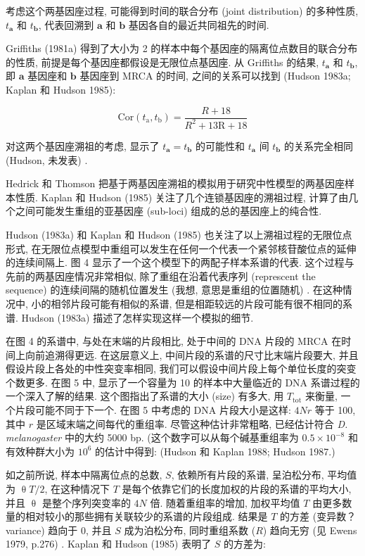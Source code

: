 \documentclass[12pt]{article}
\begin{document}
考虑这个两基因座过程, 可能得到时间的联合分布 (joint distribution) 的多种性质, $t_{\mathbf{a}}$ 和
$t_{\mathbf{b}}$, 代表回溯到 $\mathbf{a}$ 和 $\mathbf{b}$ 基因各自的最近共同祖先的时间.

Griffiths (1981a) 得到了大小为 2 的样本中每个基因座的隔离位点数目的联合分布的性质,
前提是每个基因座都假设是无限位点基因座. 从 Griffiths 的结果, $t_{\mathbf{a}}$ 和 $t_{\mathbf{b}}$, 即
$\mathbf{a}$ 基因座和 $\mathbf{b}$ 基因座到 MRCA 的时间, 之间的关系可以找到 (Hudson 1983a; Kaplan 和 Hudson
1985):

\begin{equation} \label{eq:13}
    \text{Cor}(t_{\mathrm{a}},t_{\mathrm{b}})=\frac{R+18}{R^{2}+13\mathrm{R}+18}
\end{equation}

对这两个基因座溯祖的考虑, 显示了 $t_{\mathbf{a}}=t_{\mathbf{b}}$ 的可能性和 $t_{\mathbf{a}}$ 间
$t_{\mathbf{b}}$ 的关系完全相同 (Hudson, 未发表) .

Hedrick 和 Thomson 把基于两基因座溯祖的模拟用于研究中性模型的两基因座样本性质. Kaplan 和 Hudson (1985)
关注了几个连锁基因座的溯祖过程, 计算了由几个之间可能发生重组的亚基因座 (sub-loci) 组成的总的基因座上的纯合性.

Hudson (1983a) 和 Kaplan 和 Hudson (1985) 也关注了以上溯祖过程的无限位点形式,
在无限位点模型中重组可以发生在任何一个代表一个紧邻核苷酸位点的延伸的连续间隔上. 图 4
显示了一个这个模型下的两配子样本系谱的代表. 这个过程与先前的两基因座情况非常相似, 除了重组在沿着代表序列 (represcent the
sequence) 的连续间隔的随机位置发生 (我想, 意思是重组的位置随机) . 在这种情况中, 小的相邻片段可能有相似的系谱,
但是相距较远的片段可能有很不相同的系谱. Hudson (1983a) 描述了怎样实现这样一个模拟的细节.

在图 4 的系谱中, 与处在末端的片段相比, 处于中间的 DNA 片段的 MRCA 在时间上向前追溯得更远. 在这层意义上,
中间片段的系谱的尺寸比末端片段要大, 并且假设片段上各处的中性突变率相同, 我们可以假设中间片段上每个单位长度的突变个数更多.
在图 5 中, 显示了一个容量为 10 的样本中大量临近的 DNA 系谱过程的一个深入了解的结果. 这个图指出了系谱的大小 (size)
有多大, 用 $T_{\text{tot}}$ 来衡量, 一个片段可能不同于下一个. 在图 5 中考虑的 DNA 片段大小是这样: $4Nr$ 等于 100, 其中
$r$ 是区域末端之间每代的重组率. 尽管这种估计非常粗略, 已经估计符合 \textit{D. melanogaster} 中的大约 5000 bp.
(这个数字可以从每个碱基重组率为 $0.5\times 10^{-8}$ 和有效种群大小为 $10^{6}$ 的估计中得到:  (Hudson 和 Kaplan
1988; Hudson 1987.)

如之前所说, 样本中隔离位点的总数, $S$, 依赖所有片段的系谱, 呈泊松分布, 平均值为 $\uptheta T/2$, 在这种情况下 $T$
是每个依靠它们的长度加权的片段的系谱的平均大小, 并且 $\uptheta$ 是整个序列突变率的 $4N$ 倍. 随着重组率的增加, 加权平均值
$T$ 由更多数量的相对较小的那些拥有关联较少的系谱的片段组成. 结果是 $T$ 的方差 (变异数？ variance) 趋向于 0, 并且 $S$
成为泊松分布, 同时重组系数 ($R$) 趋向无穷 (见 Ewens 1979, p.276) . Kaplan 和 Hudson (1985) 表明了 $S$
的方差为:
\end{document}
